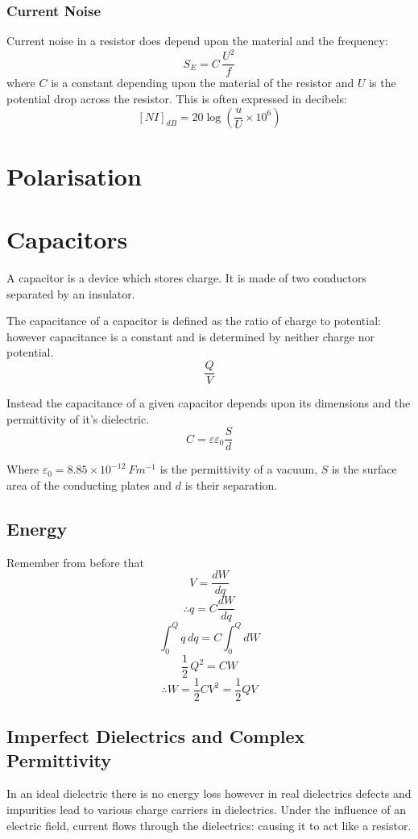\documentclass[11pt,a4paper]{report}
\begin{document}
\subsubsection{Current Noise}
Current noise in a resistor does depend upon the material and the frequency:
\[S_E = C \, \frac{U^2}{f}\] where $C$ is a constant depending upon the material of the resistor and $U$ is the potential drop across the resistor.
This is often expressed in decibels:
\[[NI]_{dB} = 20 \log \left( \frac{u}{U} \times 10^6 \right)\]

\section{Polarisation}

\section{Capacitors}
A capacitor is a device which stores charge. It is made of two conductors separated by an insulator.

The capacitance of a capacitor is defined as the ratio of charge to potential: however capacitance is a constant and is determined by neither charge nor potential.
\[\frac{Q}{V}\]

Instead the capacitance of a given capacitor depends upon its dimensions and the permittivity of it's dielectric.
\[C=\varepsilon \varepsilon_0 \frac{S}{d}\]

Where $\varepsilon_0 = 8.85 \times10^{-12} \: Fm^{-1}$ is the permittivity of a vacuum, $S$ is the surface area of the conducting plates and $d$ is their separation.

\subsection{Energy}
Remember from before that 
\[V=\frac{dW}{dq}\]
\[\therefore q=C\frac{dW}{dq}\]
\[\int_0^Q q \, dq = C \int_0^Q dW\]
\[\frac{1}{2} \, Q^2 = CW\]
\[\therefore W=\frac{1}{2}CV^2=\frac{1}{2}QV\]

\subsection{Imperfect Dielectrics and Complex Permittivity}
In an ideal dielectric there is no energy loss however in real dielectrics defects and impurities lead to various charge carriers in dielectrics. Under the influence of an electric field, current flows through the dielectrics: causing it to act like a resistor. 
\end{document}
